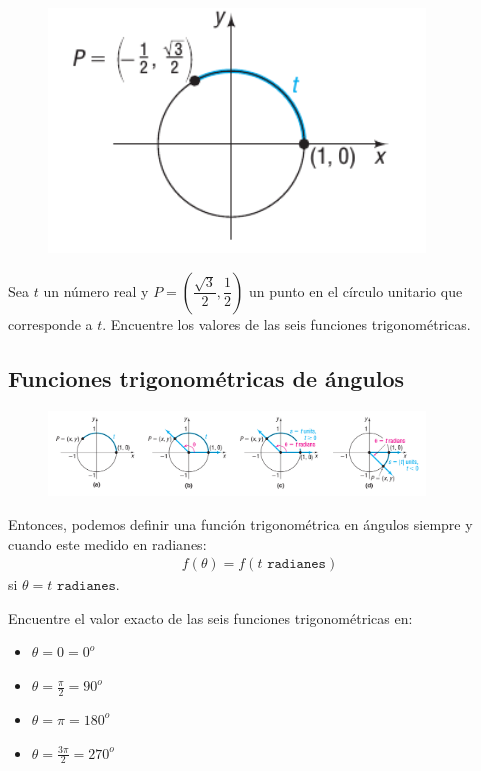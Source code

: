 {}
	\begin{figure}[h]
		\centering
		\includegraphics[width=10cm,keepaspectratio=true]{./trig/sull0619.png}
		\label{fig:0619}
	\end{figure}

{}
	\begin{problema}
		Sea $t$ un número real y $P=\left(\dfrac{\sqrt{3}}{2}, \dfrac{1}{2} \right)$
		un punto en el círculo unitario que corresponde a $t$. Encuentre los valores de las seis funciones trigonométricas.
	\end{problema}
	

\subsection{Funciones trigonométricas de ángulos}
{}
	\begin{figure}[h]
		\centering
		\includegraphics[width=10cm,keepaspectratio=true]{./trig/sull0620.png}
		\label{fig:0620}
	\end{figure}

{}
	Entonces, podemos definir una función trigonométrica en ángulos siempre y cuando este medido en radianes:
	\begin{align*}
		f(\theta)=f(t \texttt{ radianes})
	\end{align*} si $\theta= t \texttt{ radianes}$.

{}
	\begin{problema}
		\label{exmp:sull0602}
		Encuentre el valor exacto de las seis funciones trigonométricas en:
		\begin{itemize}
			\item $\theta=0=0^{o}$
			\item $\theta=\frac{\pi}{2}=90^{o}$ 
			\item $\theta=\pi=180^{o}$ 
			\item $\theta=\frac{3\pi}{2}=270^{o}$
		\end{itemize}
		
	\end{problema}
	

